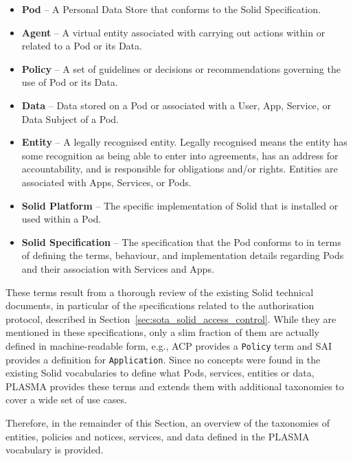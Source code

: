 \begin{itemize}
    \item \textbf{Pod} -- A Personal Data Store that conforms to the Solid Specification.
    \item \textbf{Agent} -- A virtual entity associated with carrying out actions within or related to a Pod or its Data.
    \item \textbf{Policy} -- A set of guidelines or decisions or recommendations governing the use of Pod or its Data.
    \item \textbf{Data} -- Data stored on a Pod or associated with a User, App, Service, or Data Subject of a Pod.
    \item \textbf{Entity} -- A legally recognised entity. Legally recognised means the entity has some recognition as being able to enter into agreements, has an address for accountability, and is responsible for obligations and/or rights. Entities are associated with Apps, Services, or Pods.
    \item \textbf{Solid Platform} -- The specific implementation of Solid that is installed or used within a Pod.
    \item \textbf{Solid Specification} -- The specification that the Pod conforms to in terms of defining the terms, behaviour, and implementation details regarding Pods and their association with Services and Apps.
\end{itemize}

These terms result from a thorough review of the existing Solid technical documents, in particular of the specifications related to the authorisation protocol, described in Section~\ref{sec:sota_solid_access_control}.
While they are mentioned in these specifications, only a slim fraction of them are actually defined in machine-readable form, e.g., ACP provides a \texttt{Policy} term and SAI provides a definition for \texttt{Application}.
Since no concepts were found in the existing Solid vocabularies to define what Pods, services, entities or data, PLASMA provides these terms and extends them with additional taxonomies to cover a wide set of use cases.

Therefore, in the remainder of this Section, an overview of the taxonomies of entities, policies and notices, services, and data defined in the PLASMA vocabulary is provided.


